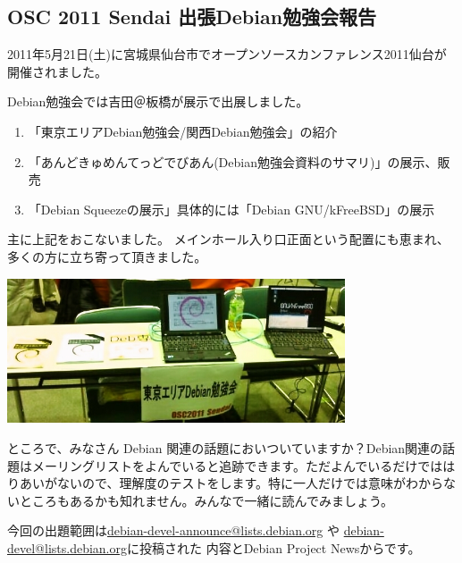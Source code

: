 \documentclass[mingoth,a4paper]{jsarticle}
\begin{document}
\subsection{OSC 2011 Sendai 出張Debian勉強会報告}
2011年5月21日(土)に宮城県仙台市でオープンソースカンファレンス2011仙台が開催されました。

Debian勉強会では吉田＠板橋が展示で出展しました。
\begin{enumerate}
\item「東京エリアDebian勉強会/関西Debian勉強会」の紹介
\item「あんどきゅめんてっどでびあん(Debian勉強会資料のサマリ)」の展示、販売
\item「Debian Squeezeの展示」具体的には「Debian GNU/kFreeBSD」の展示
\end{enumerate}
主に上記をおこないました。
メインホール入り口正面という配置にも恵まれ、多くの方に立ち寄って頂きました。

\begin{center}
\includegraphics[width=10cm]{image201106/oscsendai.jpg}
\end{center}


ところで、みなさん Debian 関連の話題においついていますか？Debian関連の話
題はメーリングリストをよんでいると追跡できます。ただよんでいるだけではは
りあいがないので、理解度のテストをします。特に一人だけでは意味がわからな
いところもあるかも知れません。みんなで一緒に読んでみましょう。

今回の出題範囲は\url{debian-devel-announce@lists.debian.org} や \url{debian-devel@lists.debian.org}に投稿された
内容とDebian Project Newsからです。

\begin{multicols}{2}
 
\end{multicols}

\end{document}
